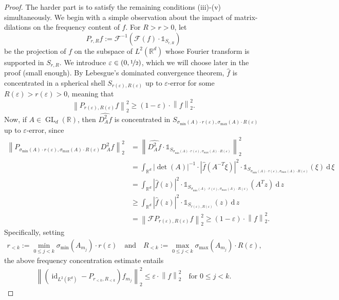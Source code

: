 \documentclass[11pt]{amsart}
\newcommand{\R}{{\mathbb{R}}}
\newcommand{\dz}{\:\mathrm{d}\,z\:}
\newcommand{\dxi}{\:\mathrm{d}\,\xi\:}
\newcommand{\norm}[1]{\ensuremath{\left\lVert\text{}#1\text{}\right\rVert}}
\DeclareMathOperator{\id}{id}
\DeclareMathOperator{\GL}{GL}
\newenvironment{proof sketch} {\textit{Proof sketch.}}{}
\begin{document}
\begin{proof}
    The harder part is to satisfy the remaining conditions (iii)-(v) simultaneously. 
    We begin with a simple observation about the impact of matrix-dilations on the frequency content of $f$.
    For $R>r>0$, let 
    \[P_{r,R}f:=\mathcal{F}^{-1}(\mathcal{F}(f)\cdot \mathds{1}_{S_{r,R}})\] 
    be the projection of $f$ on the subspace of $L^2(\R^d)$ whose Fourier transform is supported in $S_{r,R}$. We introduce $\varepsilon \in (0,\nicefrac{1}{2})$, which we will choose later in the proof (small enough). By Lebesgue's dominated convergence theorem, $\widehat{f}$ is concentrated in a spherical shell $S_{r(\varepsilon),R(\varepsilon)}$ up to $\varepsilon$-error for some $R(\varepsilon)>r(\varepsilon)>0$, meaning that
    \[\norm{P_{r(\varepsilon),R(\varepsilon)}f}_2^2
    \geq (1-\varepsilon) \cdot \norm{f}_2^2.\] 
    Now, if $A \in \GL_d(\R)$, then $\widehat{D_A^2f}$ is concentrated in $S_{\sigma_{\text{min}}(A)\cdot r(\varepsilon),\sigma_{\text{max}}(A) \cdot R(\varepsilon)}$ up to $\varepsilon$-error, since
    \begin{align*}
      \norm{P_{\sigma_{\text{min}}(A)\cdot r(\varepsilon),\sigma_{\text{max}}(A) \cdot R(\varepsilon)}D_A^2f}_2^2 
      &= \norm{\widehat{D_A^2f}\cdot \mathds{1}_{S_{\sigma_\text{min}(A)\cdot r(\varepsilon),\sigma_{\text{max}}(A)\cdot R(\varepsilon)}}}_2^2 \\
      &=\int_{\R^d}|\det(A)|^{-1} \cdot |\widehat{f}(A^{-T}\xi)|^2 \cdot \mathds{1}_{S_{\sigma_\text{min}(A)\cdot r(\varepsilon),\sigma_{\text{max}}(A)\cdot R(\varepsilon)}}(\xi) \dxi \\
      &=\int_{\R^d}|\widehat{f}(z)|^2 \cdot \mathds{1}_{S_{\sigma_\text{min}(A)\cdot r(\varepsilon),\sigma_{\text{max}}(A)\cdot R(\varepsilon)}}(A^Tz) \dz \\
      &\geq\int_{\R^d}|\widehat{f}(z)|^2 \cdot \mathds{1}_{S_{r(\varepsilon),R(\varepsilon)}}(z) \dz \\
      &=\norm{\mathcal{F}P_{r(\varepsilon),R(\varepsilon)}f}_2^2 \geq (1-\varepsilon) \cdot \norm{f}_2^2.
    \end{align*}
    Specifically, setting 
    \begin{align*}
      r_{<k}:=\min_{0\leq j<k} \sigma_{\text{min}}(A_{m_j}) \cdot r(\varepsilon) \quad \text{and} \quad R_{<k}:=\max_{0\leq j<k} \sigma_{\text{max}}(A_{m_j}) \cdot R(\varepsilon),
    \end{align*}
    the above frequency concentration estimate entails
    \begin{align*}
      \norm{(\id_{L^2(\R^d)}-P_{r_{<k},R_{<k}})f_{m_j}}_2^2 \leq \varepsilon \cdot \norm{f}_2^2 \quad \text{for } 0\leq j <k.

\end{align*}
\end{proof}
\end{document}
